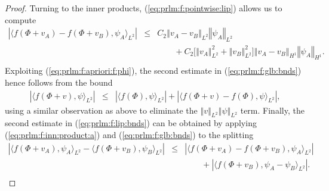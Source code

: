 \documentclass[10pt]{articleHJ}
\newcommand{\abs}[1]{\left\vert#1\right\vert}			%
\newcommand{\norm}[1]{\left\Vert#1\right\Vert}		%
\newcommand{\sref}[1]{(\ref{#1})}                       %
\numberwithin{equation}{section}
\begin{document}
\begin{proof}
Turning to the inner products,
\sref{eq:prlm:f:pointwise:lip}
allows us to compute
\begin{equation}
\label{eq:prlm:f:inn:product:a}
\begin{array}{lcl}
\abs{\langle
  f(\Phi + v_A) - f(\Phi + v_B)  , \psi_A
\rangle_{L^2} }
&
\le & C_2 \norm{v_A - v_B}_{L^2} \norm{\psi_A}_{L^2}
\\[0.2cm]
& & \qquad
+ C_2 \big[ \norm{v_A}_{L^2}^2 + \norm{v_B}_{L^2}^2 \big]
  \norm{v_A - v_B}_{H^1} \norm{\psi_A}_{H^1} .
\\[0.2cm]
\end{array}
\end{equation}
Exploiting \sref{eq:prlm:f:apriori:f:phi},
the second estimate
in \sref{eq:prlm:f:glb:bnds}
hence follows from the bound
\begin{equation}
\begin{array}{lcl}
\abs{ \langle f(\Phi + v) , \psi \rangle_{L^2} }
& \le&
\abs{ \langle f(\Phi), \psi \rangle_{L^2} }
+ \abs{ \langle f(\Phi + v) - f(\Phi),
   \psi \rangle_{L^2} },
\end{array}
\end{equation}
using a similar observation
as above to eliminate
the $\norm{v}_{L^2} \norm{\psi}_{L^2}$
term.
Finally, the second estimate
in \sref{eq:prlm:f:lip:bnds}
can be obtained by applying
\sref{eq:prlm:f:inn:product:a}
and
\sref{eq:prlm:f:glb:bnds}
to the splitting
\begin{equation}
\begin{array}{lcl}
\abs{ \langle f(\Phi + v_A), \psi_A \rangle_{L^2}
- \langle f(\Phi + v_B ) , \psi_B \rangle_{L^2} }
& \le &
  \abs{ \langle f(\Phi + v_A) - f(\Phi + v_B) , \psi_A \rangle_{L^2} }
\\[0.2cm]
& & \qquad
  + \abs{ \langle f(\Phi + v_B), \psi_A - \psi_B \rangle_{L^2} } .
\\[0.2cm]
\end{array}
\end{equation}
\end{proof}
\end{document}
